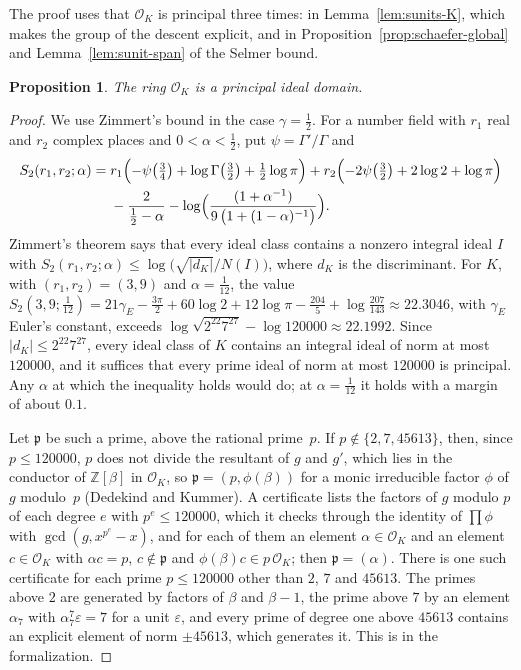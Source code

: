 \documentclass[11pt]{amsart}
\newtheorem{proposition}[theorem]{Proposition}
\theoremstyle{definition}
\numberwithin{equation}{section}
\newcommand{\Z}{\mathbb{Z}}
\newcommand{\OK}{\mathcal{O}_K}
\newcommand{\lean}[1]{\ignorespaces}
\newcommand{\computed}[1]{\ignorespaces}
\begin{document}
The proof uses that $\OK$ is principal three times: in Lemma~\ref{lem:sunits-K}, which makes the group of the descent explicit, and in Proposition~\ref{prop:schaefer-global} and Lemma~\ref{lem:sunit-span} of the Selmer bound.

\begin{proposition}\label{prop:classnumber}\lean{FurioLombardo.M2.Proved.isPrincipalIdealRing_M1K21, FurioLombardo.M2.Proved.clK21TwoTorsionTrivial}\computed{code/field/zimmert_num_check.gp, code/field/zimmert_num_check.out}
The ring $\OK$ is a principal ideal domain.
\end{proposition}

\begin{proof}
We use Zimmert's bound \cite[Satz~2]{Zimmert81} in the case $\gamma=\tfrac12$. For a number field with $r_1$ real and $r_2$ complex places and $0<\alpha<\tfrac12$, put $\psi=\Gamma'/\Gamma$ and
\[
\begin{aligned}
S_2(r_1,r_2;\alpha)={}&r_1\Bigl(-\psi\bigl(\tfrac34\bigr)+\log\Gamma\bigl(\tfrac32\bigr)+\tfrac12\log\pi\Bigr)
+r_2\Bigl(-2\psi\bigl(\tfrac32\bigr)+2\log2+\log\pi\Bigr)\\
&-\frac{2}{\frac12-\alpha}-\log\Bigl(\frac{(1+\alpha^{-1})}{9\,\bigl(1+(1-\alpha)^{-1}\bigr)}\Bigr).
\end{aligned}
\]
Zimmert's theorem says that every ideal class contains a nonzero integral ideal $I$ with $S_2(r_1,r_2;\alpha)\le\log\bigl(\sqrt{|d_K|}/N(I)\bigr)$, where $d_K$ is the discriminant. For $K$, with $(r_1,r_2)=(3,9)$ and $\alpha=\tfrac1{12}$, the value $S_2(3,9;\tfrac1{12})=21\gamma_E-\tfrac{3\pi}{2}+60\log2+12\log\pi-\tfrac{204}{5}+\log\tfrac{207}{143}\approx22.3046$, with $\gamma_E$ Euler's constant, exceeds $\log\sqrt{2^{22}7^{27}}-\log120000\approx22.1992$. Since $|d_K|\le2^{22}7^{27}$, every ideal class of $K$ contains an integral ideal of norm at most $120000$, and it suffices that every prime ideal of norm at most $120000$ is principal. Any $\alpha$ at which the inequality holds would do; at $\alpha=\tfrac1{12}$ it holds with a margin of about $0.1$.

Let $\mathfrak p$ be such a prime, above the rational prime~$p$. If $p\notin\{2,7,45613\}$, then, since $p\le120000$, $p$ does not divide the resultant of $g$ and $g'$, which lies in the conductor of $\Z[\beta]$ in $\OK$, so $\mathfrak p=(p,\phi(\beta))$ for a monic irreducible factor $\phi$ of $g$ modulo~$p$ (Dedekind and Kummer). A certificate lists the factors of $g$ modulo $p$ of each degree $e$ with $p^e\le120000$, which it checks through the identity of $\prod\phi$ with $\gcd(g,x^{p^e}-x)$, and for each of them an element $\alpha\in\OK$ and an element $c\in\OK$ with $\alpha c=p$, $c\notin\mathfrak p$ and $\phi(\beta)c\in p\,\OK$; then $\mathfrak p=(\alpha)$. There is one such certificate for each prime $p\le120000$ other than $2$, $7$ and $45613$. The primes above $2$ are generated by factors of $\beta$ and $\beta-1$, the prime above $7$ by an element $\alpha_7$ with $\alpha_7^7\varepsilon=7$ for a unit $\varepsilon$, and every prime of degree one above $45613$ contains an explicit element of norm $\pm45613$, which generates it. This is  in the formalization.
\end{proof}
\end{document}
